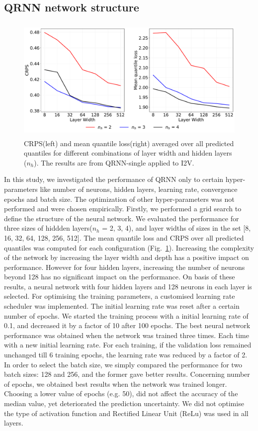 \documentclass[amt, manuscript]{copernicus}
\begin{document}
\subsection{QRNN network structure}
%
\begin{figure}[t]
	\centering
	\includegraphics[height=60mm]{Figures/CRPS.pdf} 
	\caption{CRPS(left) and mean quantile loss(right) averaged over all predicted quantiles for different combinations of layer width and hidden layers ($n_h$). The results are from QRNN-single applied to I2V.}
	\label{fig:grid_search}	
\end{figure}
In this study, we investigated the performance of QRNN only to certain hyper-parameters like number of neurons, hidden layers, learning rate, convergence epochs and batch size. The optimization of other hyper-parameters was not performed and were chosen empirically. Firstly, we performed a grid search to define the structure of the neural network. We evaluated the performance for three sizes of hiddden layers($n_h$ = 2, 3, 4), and layer widths of sizes in the set [8, 16, 32, 64, 128, 256, 512]. The mean quantile loss and CRPS over all predicted quantiles was computed for each configuration (Fig.~\ref{fig:grid_search}). Increasing the complexity of the network by increasing the layer width and depth has a positive impact on performance. However for four hidden layers, increasing the number of neurons beyond 128 has no significant impact on the performance. On basis of these results, a neural network with four hidden layers and 128 neurons in each layer is selected. For optimising the training parameters, a customised  learning rate scheduler was implemented. The initial learning rate was reset after a certain number of epochs.  We started the training process with a initial learning rate of 0.1, and decreased it by a factor of 10 after 100 epochs. The best neural network performance was obtained when the network was trained three times. Each time with a new initial learning rate. For each training, if the validation loss remained unchanged till 6 training epochs, the learning rate was reduced by a factor of 2. 
In order to select the batch size, we simply compared the performance for two batch sizes: 128 and 256, and the former gave better results. Concerning number of epochs, we obtained best results when the network was trained longer. Choosing a lower value of epochs (e.g. 50), did not affect the accuracy of the median value, yet deteriorated the prediction uncertainty. We did not optimise the type of activation function and Rectified Linear Unit (ReLu) was used in all layers. 
\end{document}
